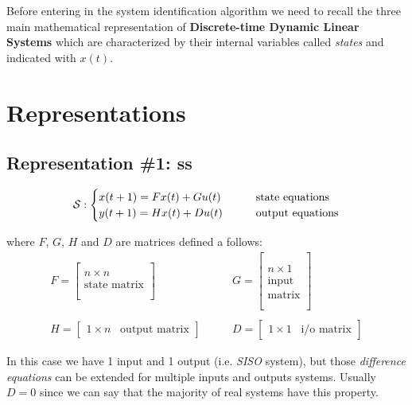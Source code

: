 Before entering in the system identification algorithm we need to recall the three main mathematical representation of \textbf{Discrete-time Dynamic Linear Systems} which are characterized by their internal variables called \emph{states} and indicated with $x(t)$.


\section{Representations}

\subsection{Representation \#1: \acrfull{ss}}

\[
\mathcal{S}: 
\begin{cases}
    x(t+1) = F x(t) + G u(t) & \qquad \text{state equations} \\
    y(t+1) = H x(t) + D u(t) & \qquad \text{output equations}
\end{cases}
\]

where $F$, $G$, $H$ and $D$ are matrices defined a follows:
\begin{align*}
    F = \begin{bmatrix}
        \\
        n \times n \\
        \text{state matrix} \\ \\
    \end{bmatrix}
    &
    \qquad
    G = \begin{bmatrix}
        \\
        \\
        n \times 1 \\
        \text{input} \\
        \text{matrix} \\ \\
    \end{bmatrix}
    \\ \\
    H = \begin{bmatrix}
        1 \times n \;\;\; \text{output matrix}
    \end{bmatrix}
    &
    \qquad
    D = \begin{bmatrix}
        1 \times 1 \;\;\; \text{i/o matrix}
    \end{bmatrix}
\end{align*}

In this case we have 1 input and 1 output (i.e. \emph{SISO} system), but those \emph{difference equations} can be extended for multiple inputs and outputs systems. Usually $D=0$ since we can say that the majority of real systems have this property. 

